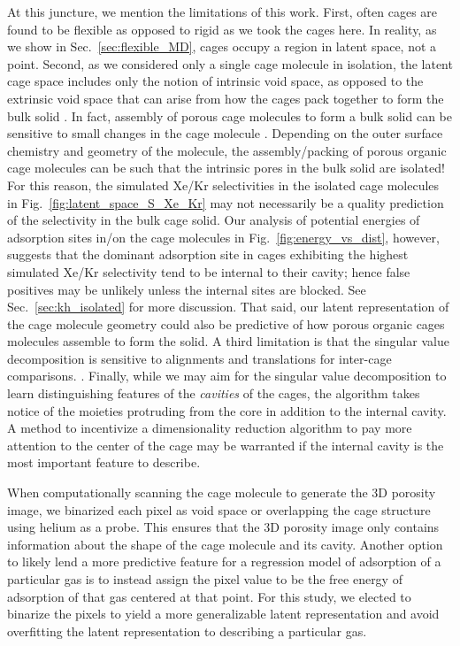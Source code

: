 \documentclass[journal=jacsat,manuscript=article,layout=traditional]{achemso}
\begin{document}
At this juncture, we mention the limitations of this work. First, often cages are found to be flexible \cite{chen2014separation,camp2016transition,holden2014gas,holden2016understanding} as opposed to rigid as we took the cages here. {\color{red} In reality, as we show in Sec.~\ref{sec:flexible_MD}, cages occupy a region in latent space, not a point.} Second, as we considered only a single cage molecule in isolation, the latent cage space includes only the notion of intrinsic void space, as opposed to the extrinsic void space that can arise from how the cages pack together to form the bulk solid \cite{hasell2016porous}. In fact, assembly of porous cage molecules to form a bulk solid can be sensitive to small changes in the cage molecule \cite{hasell2014controlling}. Depending on the outer surface chemistry and geometry of the molecule, the assembly/packing of porous organic cage molecules can be such that the intrinsic pores in the bulk solid are isolated!\cite{tozawa2009porous} {\color{red} For this reason, the simulated Xe/Kr selectivities in the isolated cage molecules in Fig.~\ref{fig:latent_space_S_Xe_Kr} may not necessarily be a quality prediction of the selectivity in the bulk cage solid. Our analysis of potential energies of adsorption sites in/on the cage molecules in Fig.~\ref{fig:energy_vs_dist}, however, suggests that the dominant adsorption site in cages exhibiting the highest simulated Xe/Kr selectivity tend to be internal to their cavity; hence false positives may be unlikely unless the internal sites are blocked. See Sec.~\ref{sec:kh_isolated} for more discussion.} That said, our latent representation of the cage molecule geometry could also be predictive of how porous organic cages molecules assemble to form the solid. A third limitation is that the singular value decomposition is sensitive to alignments and translations for inter-cage comparisons. . {\color{red} Finally, while we may aim for the singular value decomposition to learn distinguishing features of the \emph{cavities} of the cages, the algorithm takes notice of the moieties protruding from the core in addition to the internal cavity. A method to incentivize a dimensionality reduction algorithm to pay more attention to the center of the cage may be warranted if the internal cavity is the most important feature to describe.}

{\color{red} When computationally scanning the cage molecule to generate the 3D porosity image, we binarized each pixel as void space or overlapping the cage structure using helium as a probe. This ensures that the 3D porosity image only contains information about the shape of the cage molecule and its cavity. Another option to likely lend a more predictive feature for a regression model of adsorption of a particular gas is to instead assign the pixel value to be the free energy of adsorption of that gas centered at that point. For this study, we elected to binarize the pixels to yield a more generalizable latent representation and avoid overfitting the latent representation to describing a particular gas.}
\end{document}
